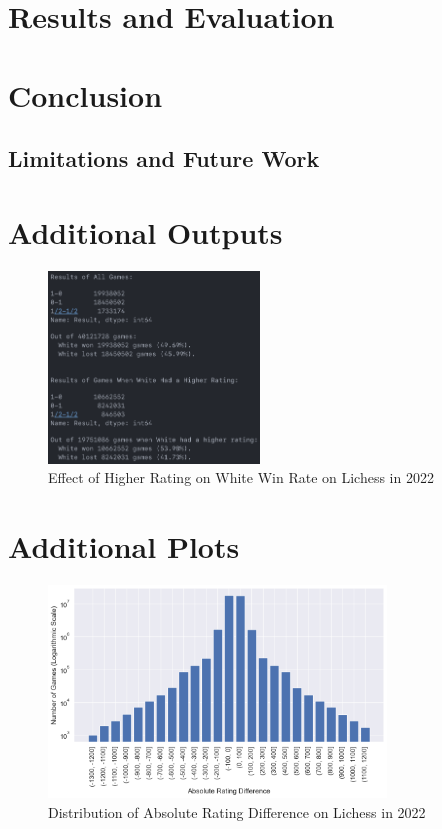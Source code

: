 \documentclass[a4paper, 11pt]{article}
\begin{document}
\section{Results and Evaluation}

\section{Conclusion}

\subsection{Limitations and Future Work}




\newpage
\begin{appendices}

\section{Additional Outputs}
\begin{figure}[H]
    \centering
    \caption{Effect of Higher Rating on White Win Rate on Lichess in 2022}
    \label{fig:effectOfHigherRatingOnWhiteWinRate}
    \includegraphics[width=0.5\textwidth]{Effect of Higher Rating on White Win Rate.png}
\end{figure}

\section{Additional Plots}
\begin{figure}[H]
    \centering
    \caption{Distribution of Absolute Rating Difference on Lichess in 2022}
    \label{fig:distributionOfAbsoluteRatingDifference}
    \includegraphics[width=0.8\textwidth]{Distribution of Absolute Rating Difference.png}
\end{figure}


\end{appendices}
\end{document}

